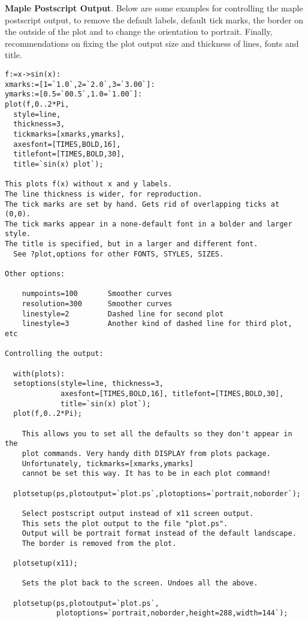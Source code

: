 {\bf Maple Postscript Output}.
Below are some examples for controlling the maple postscript output,
to remove the default labels, default tick marks, the border on the
outside of the plot and to change the orientation to portrait. Finally,
recommendations on fixing the plot output size and thickness of lines,
fonts and title.

\begin{verbatim}
f:=x->sin(x):
xmarks:=[1=`1.0`,2=`2.0`,3=`3.00`]:
ymarks:=[0.5=`00.5`,1.0=`1.00`]:
plot(f,0..2*Pi,
  style=line,
  thickness=3,
  tickmarks=[xmarks,ymarks],
  axesfont=[TIMES,BOLD,16],
  titlefont=[TIMES,BOLD,30],
  title=`sin(x) plot`);

This plots f(x) without x and y labels.
The line thickness is wider, for reproduction.
The tick marks are set by hand. Gets rid of overlapping ticks at (0,0).
The tick marks appear in a none-default font in a bolder and larger style.
The title is specified, but in a larger and different font.
  See ?plot,options for other FONTS, STYLES, SIZES.

Other options:

    numpoints=100       Smoother curves
    resolution=300      Smoother curves
    linestyle=2         Dashed line for second plot
    linestyle=3         Another kind of dashed line for third plot, etc

Controlling the output:

  with(plots):
  setoptions(style=line, thickness=3,
             axesfont=[TIMES,BOLD,16], titlefont=[TIMES,BOLD,30],
             title=`sin(x) plot`);
  plot(f,0..2*Pi);

    This allows you to set all the defaults so they don't appear in the
    plot commands. Very handy dith DISPLAY from plots package.
    Unfortunately, tickmarks=[xmarks,ymarks]
    cannot be set this way. It has to be in each plot command!

  plotsetup(ps,plotoutput=`plot.ps`,plotoptions=`portrait,noborder`);

    Select postscript output instead of x11 screen output.
    This sets the plot output to the file "plot.ps".
    Output will be portrait format instead of the default landscape.
    The border is removed from the plot.

  plotsetup(x11);

    Sets the plot back to the screen. Undoes all the above.

  plotsetup(ps,plotoutput=`plot.ps`,
            plotoptions=`portrait,noborder,height=288,width=144`);


\end{verbatim}
